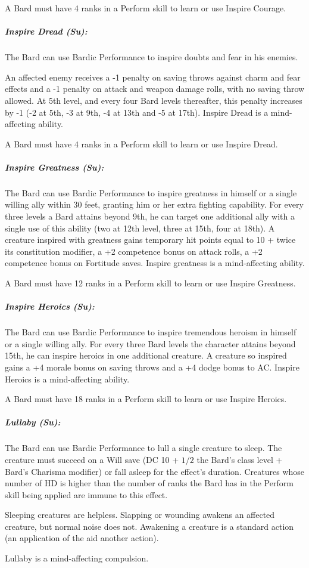 A Bard must have 4 ranks in a Perform skill to learn or use Inspire Courage.
\subparagraph{Inspire Dread (Su):}
The Bard can use Bardic Performance to inspire doubts and fear in his enemies.

An affected enemy receives a -1 penalty on saving throws against charm and fear effects and a -1 penalty on attack and weapon damage rolls, with no saving throw allowed. At 5th level, and every four Bard levels thereafter, this penalty increases by -1 (-2 at 5th, -3 at 9th, -4 at 13th and -5 at 17th). Inspire Dread is a mind-affecting ability.

A Bard must have 4 ranks in a Perform skill to learn or use Inspire Dread.
\subparagraph{Inspire Greatness (Su):}
The Bard can use Bardic Performance to inspire greatness in himself or a single willing ally within 30 feet, granting him or her extra fighting capability. 
For every three levels a Bard attains beyond 9th, he can target one additional ally with a single use of this ability (two at 12th level, three at 15th, four at 18th).
A creature inspired with greatness gains temporary hit points equal to 10 + twice its constitution modifier, a +2 competence bonus on attack rolls, a +2 competence bonus on Fortitude saves. Inspire greatness is a mind-affecting ability.

A Bard must have 12 ranks in a Perform skill to learn or use Inspire Greatness.
\subparagraph{Inspire Heroics (Su):}
The Bard can use Bardic Performance to inspire tremendous heroism in himself or a single willing ally.
For every three Bard levels the character attains beyond 15th, he can inspire heroics in one additional creature.
A creature so inspired gains a +4 morale bonus on saving throws and a +4 dodge bonus to AC. Inspire Heroics is a mind-affecting ability.

A Bard must have 18 ranks in a Perform skill to learn or use Inspire Heroics.
\subparagraph{Lullaby (Su):}
The Bard can use Bardic Performance to lull a single creature to sleep.
The creature must succeed on a Will save (DC 10 + $1/2$ the Bard's class level + Bard's Charisma modifier) or fall asleep for the effect's duration.
Creatures whose number of HD is higher than the number of ranks the Bard has in the Perform skill being applied are immune to this effect.

Sleeping creatures are helpless. Slapping or wounding awakens an affected creature, but normal noise does not. 
Awakening a creature is a standard action (an application of the aid another action).

Lullaby is a mind-affecting compulsion.

